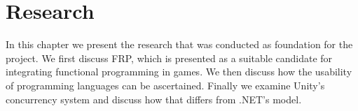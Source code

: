 \chapter{Research}
In this chapter we present the research that was conducted as foundation for the project. We first discuss \gls{FRP}, which is presented as a suitable candidate for integrating functional programming in games\cite{maraffi:frp,courtney2003yampa,cheong2005functional}. We then discuss how the usability of programming languages can be ascertained. Finally we examine Unity's concurrency system and discuss how that differs from .NET's  model.





